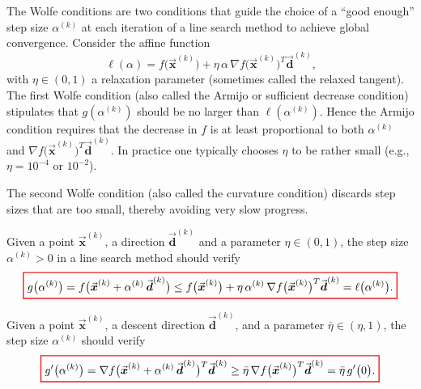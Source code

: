 \documentclass[9pt, headings=standardclasses, parskip=half]{scrartcl}
\renewcommand{\emph}[1]{\textcolor{mypurple}{#1}}
\newcommand{\vect}[1]{\vec{\boldsymbol{#1}}}
\begin{document}
The Wolfe conditions are two conditions that guide the choice of a “good enough” step size \(\alpha^{(k)}\) at each iteration of a line search method to achieve global convergence. Consider the affine function
\[
\ell(\alpha) = f\bigl(\vect{x}^{(k)}\bigr) + \eta\,\alpha\, \nabla f\bigl(\vect{x}^{(k)}\bigr)^T \vect{d}^{(k)} \text{,}
\]
with \(\eta \in (0,1)\) a relaxation parameter (sometimes called the \emph{relaxed tangent}). The first Wolfe condition (also called the \emph{Armijo} or \emph{sufficient decrease condition}) stipulates that \(g(\alpha^{(k)})\) should be no larger than \(\ell(\alpha^{(k)})\).
Hence the Armijo condition requires that the decrease in \(f\) is at least proportional to both \(\alpha^{(k)}\) and \(\nabla f\bigl(\vect{x}^{(k)}\bigr)^T \vect{d}^{(k)}\). In practice one typically chooses \(\eta\) to be rather small (e.g., \(\eta = 10^{-4}\) or \(10^{-2}\)).

The second Wolfe condition (also called the \emph{curvature condition}) discards step sizes that are too small, thereby avoiding very slow progress.

\begin{definition}
\label{def:first_wolfe_condition}
Given a point \(\vect{x}^{(k)}\), a direction \(\vect{d}^{(k)}\) and a parameter \(\eta \in (0,1)\), the step size \(\alpha^{(k)}>0\) in a line search method should verify
\begin{equation}
\label{eq:first_wolfe_condition}
{\color{Red}
\setlength{\fboxrule}{1pt}
\boxed{ 
\color{black}
g\bigl(\alpha^{(k)}\bigr) 
=
f\bigl(\vect{x}^{(k)} + \alpha^{(k)}\,\vect{d}^{(k)}\bigr) 
\le 
f\bigl(\vect{x}^{(k)}\bigr) + \eta\, \alpha^{(k)}\, \nabla f\bigl(\vect{x}^{(k)}\bigr)^T \vect{d}^{(k)} 
= 
\ell\bigl(\alpha^{(k)}\bigr) \text{.}
}
}
\end{equation}
\end{definition}

\begin{definition}
\label{def:second_wolfe_condition}
Given a point \(\vect{x}^{(k)}\), a descent direction \(\vect{d}^{(k)}\), and a parameter \(\bar{\eta} \in (\eta, 1)\), the step size \(\alpha^{(k)}\) should verify
\begin{equation}
\label{eq:second_wolfe_condition}
{\color{Red}
\setlength{\fboxrule}{1pt}
\boxed{ 
\color{black}
g'\bigl(\alpha^{(k)}\bigr) 
= 
\nabla f\bigl(\vect{x}^{(k)} + \alpha^{(k)}\,\vect{d}^{(k)}\bigr)^T \vect{d}^{(k)} 
\ge 
\bar{\eta}\, \nabla f\bigl(\vect{x}^{(k)}\bigr)^T \vect{d}^{(k)}
=
\bar{\eta}\,g'\bigl(0\bigr)
\text{.}
}
}
\end{equation}
\end{definition}
\end{document}
